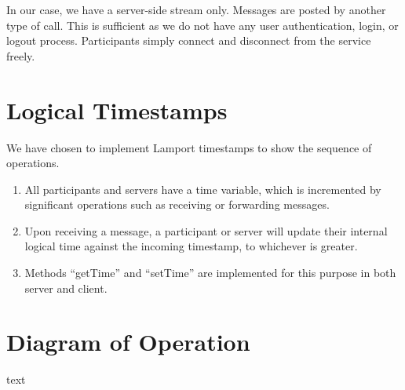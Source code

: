 \documentclass[a4paper,11pt]{article}
\begin{document}
In our case, we have a server-side stream only. Messages are posted by another type of call. This is sufficient as we do not have any user authentication, login, or logout process. Participants simply connect and disconnect from the service freely. 

\section{Logical Timestamps}
We have chosen to implement Lamport timestamps to show the sequence of operations. 

\begin{enumerate}
    \item All participants and servers have a time variable, which is incremented by significant operations such as receiving or forwarding messages. 
    \item Upon receiving a message, a participant or server will update their internal logical time against the incoming timestamp, to whichever is greater. 
    \item Methods ``getTime'' and ``setTime'' are implemented for this purpose in both server and client. 
\end{enumerate}

\section{Diagram of Operation}
text
\end{document}
